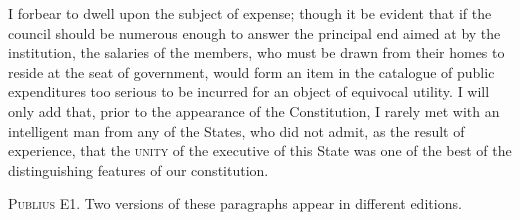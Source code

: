 I forbear to dwell upon the subject of expense; though it be evident that if the council should be numerous enough to answer the principal end aimed at by the institution, the salaries of the members, who must be drawn from their homes to reside at the seat of government, would form an item in the catalogue of public expenditures too serious to be incurred for an object of equivocal utility. I will only add that, prior to the appearance of the Constitution, I rarely met with an intelligent man from any of the States, who did not admit, as the result of experience, that the \textsc{unity }of the executive of this State was one of the best of the distinguishing features of our constitution.

\vspace{.5cm}
\textsc{Publius}
E1. Two versions of these paragraphs appear in different editions.

